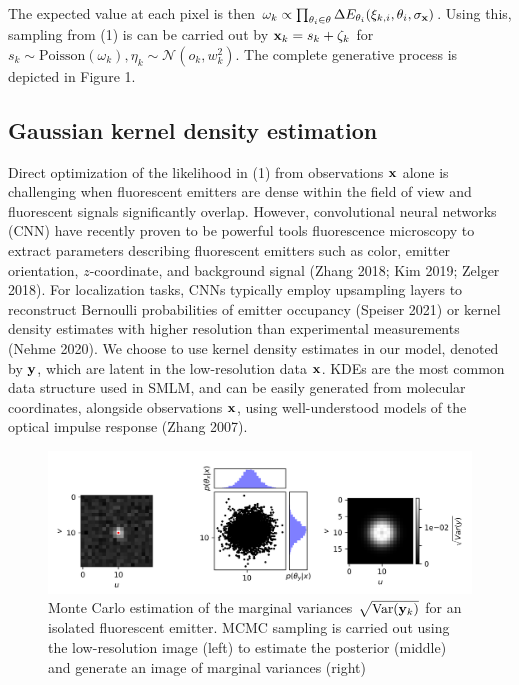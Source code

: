 \documentclass{article}
\begin{document}
The expected value at each pixel is then $\omega_{k}\propto \prod_{\theta_{i}\in \theta} \Delta E_{\theta_{i}}(\xi_{k,i},\theta_{i},\sigma_{\bold{x}}) $. Using this, sampling from (1) is can be carried out by $\bold{x}_{k} = s_{k} + \zeta_{k}$ for $s_{k}\sim \mathrm{Poisson}(\omega_{k}), \eta_{k}\sim \mathcal{N}(o_{k},w_{k}^{2})$. The complete generative process is depicted in Figure 1. 

\subsection{Gaussian kernel density estimation}

Direct optimization of the likelihood in (1) from observations $\bold{x}$ alone is challenging when fluorescent emitters are dense within the field of view and fluorescent signals significantly overlap. However, convolutional neural networks (CNN) have recently proven to be powerful tools fluorescence microscopy to extract parameters describing fluorescent emitters such as color, emitter orientation, $z$-coordinate, and background signal (Zhang 2018; Kim 2019; Zelger 2018). For localization tasks, CNNs typically employ upsampling layers to reconstruct Bernoulli probabilities of emitter occupancy (Speiser 2021) or kernel density estimates with higher resolution than experimental measurements (Nehme 2020). We choose to use kernel density estimates in our model, denoted by $\bold{y}$, which are latent in the low-resolution data $\bold{x}$. KDEs are the most common data structure used in SMLM, and can be easily generated from molecular coordinates, alongside observations $\bold{x}$, using well-understood models of the optical impulse response (Zhang 2007). 

\begin{figure}
\includegraphics[scale=0.7]{MCMC.png}
\caption{Monte Carlo estimation of the marginal variances $\sqrt{\mathrm{Var}(\bold{y}_k)}$ for an isolated fluorescent emitter. MCMC sampling is carried out using the low-resolution image (left) to estimate the posterior (middle) and generate an image of marginal variances (right)}
\end{figure}
\end{document}
